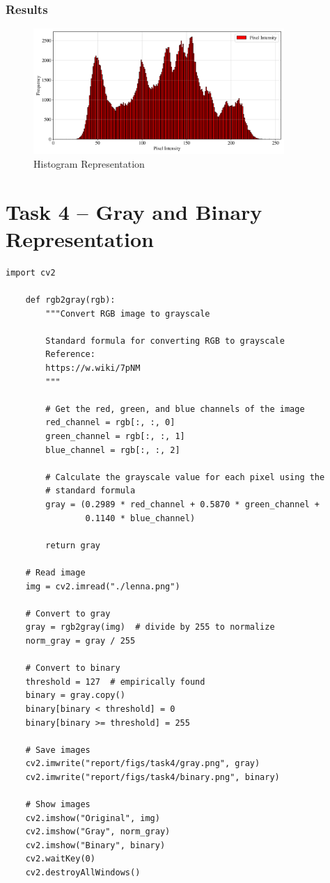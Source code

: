 \documentclass[11pt,a4paper]{article}
\begin{document}
\subsubsection*{Results}
\begin{figure}[ht!]
    \centering
    \includegraphics[width=0.85\textwidth]{figs/task3/histogram.png}
    \caption{Histogram Representation}
\end{figure}

\newpage
\section{Task 4 -- Gray and Binary Representation}

\begin{lstlisting}[language=iPython, title=Python Code for Gray and Binary Representation]
    import cv2

    def rgb2gray(rgb):
        """Convert RGB image to grayscale
    
        Standard formula for converting RGB to grayscale
        Reference:
        https://w.wiki/7pNM
        """
    
        # Get the red, green, and blue channels of the image
        red_channel = rgb[:, :, 0]
        green_channel = rgb[:, :, 1]
        blue_channel = rgb[:, :, 2]
    
        # Calculate the grayscale value for each pixel using the 
        # standard formula
        gray = (0.2989 * red_channel + 0.5870 * green_channel + 
                0.1140 * blue_channel)
    
        return gray
    
    # Read image
    img = cv2.imread("./lenna.png")
    
    # Convert to gray
    gray = rgb2gray(img)  # divide by 255 to normalize
    norm_gray = gray / 255
    
    # Convert to binary
    threshold = 127  # empirically found
    binary = gray.copy()
    binary[binary < threshold] = 0
    binary[binary >= threshold] = 255
    
    # Save images
    cv2.imwrite("report/figs/task4/gray.png", gray)
    cv2.imwrite("report/figs/task4/binary.png", binary)
    
    # Show images
    cv2.imshow("Original", img)
    cv2.imshow("Gray", norm_gray)
    cv2.imshow("Binary", binary)
    cv2.waitKey(0)
    cv2.destroyAllWindows()
\end{lstlisting}
\end{document}
